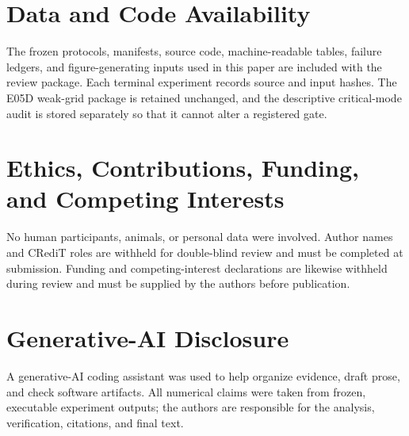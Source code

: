 \documentclass[journal]{IEEEtran}
\begin{document}
\section*{Data and Code Availability}
The frozen protocols, manifests, source code, machine-readable tables,
failure ledgers, and figure-generating inputs used in this paper are included
with the review package. Each terminal experiment records source and input
hashes. The E05D weak-grid package is retained unchanged, and the descriptive
critical-mode audit is stored separately so that it cannot alter a registered
gate.

\section*{Ethics, Contributions, Funding, and Competing Interests}
No human participants, animals, or personal data were involved. Author names
and CRediT roles are withheld for double-blind review and must be completed at
submission. Funding and competing-interest declarations are likewise withheld
during review and must be supplied by the authors before publication.

\section*{Generative-AI Disclosure}
A generative-AI coding assistant was used to help organize evidence, draft
prose, and check software artifacts. All numerical claims were taken from
frozen, executable experiment outputs; the authors are responsible for the
analysis, verification, citations, and final text.

\balance


\end{document}
